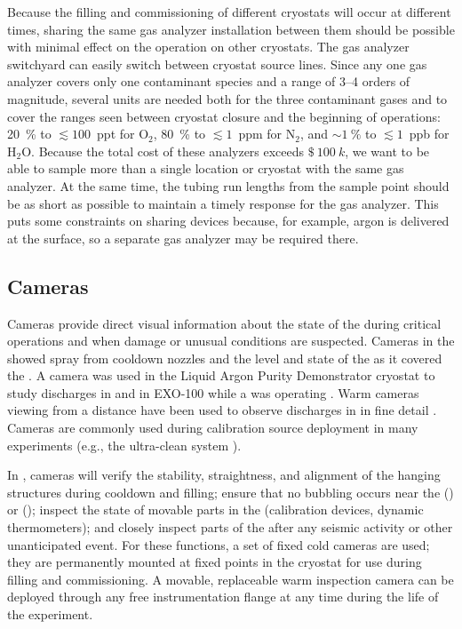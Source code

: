 Because the filling and commissioning of different cryostats will occur at different times, sharing the same gas analyzer installation between them should be possible with minimal effect on the operation on other cryostats. The gas analyzer switchyard can easily switch between cryostat source lines.
Since any one gas analyzer covers only one contaminant species and a range of \numrange{3}{4} orders of magnitude, several units are needed both for the three contaminant gases and to cover the ranges seen between cryostat closure and the beginning of  operations:
\SI{20}{\percent} to $\lesssim 100$~ppt for $\text{O}_2$,
\SI{80}{\percent} to $\lesssim 1$~ppm for $\text{N}_2$, and
$\sim \SI{1}{\percent}$ to $\lesssim 1$~ppb for $\text{H}_2\text{O}$.
Because the total cost of these analyzers exceeds $\SI{100}[\mathdollar]{k}$, we want to be able to  sample more than a single location or cryostat with the same gas analyzer. At the same time, the tubing run lengths from the sample point should be as short as possible to maintain a timely response for the gas analyzer. This puts some constraints on sharing devices because, for example, argon is delivered at the surface, so a separate gas analyzer may be required there. %


\subsection{Cameras}

Cameras provide direct visual information about the state of the
 during critical operations and when damage or unusual
conditions are suspected.  Cameras in the  showed spray from cooldown
nozzles and the level and state of the \lar as it covered the  \cite{Murphy:20170516}.  A camera was
used in the Liquid Argon Purity Demonstrator
cryostat\cite{Adamowski:2014daa} to study  discharges in
\lar and in EXO-100 while a  was operating
\cite{Delaquis:2013hva}.  Warm cameras viewing \lar from a distance
have been used to observe  discharges in \lar in
fine detail \cite{Auger:2015xlo}.  Cameras are commonly used during
calibration source deployment in many experiments (e.g., the
\kamland ultra-clean system \cite{Banks:2014hra}).

In , cameras will verify the stability, straightness,
and alignment of the hanging  structures during cooldown and
filling; ensure that no bubbling occurs near the 
(\single) or  (\dual); inspect the
state of movable parts in the  (calibration devices, dynamic
thermometers); and closely inspect parts of the  after any seismic activity or other unanticipated
event.  For these functions, a set of fixed
cold cameras are used; they are permanently mounted at fixed points in the cryostat
for use during filling and commissioning. A movable, replaceable
warm inspection camera can be deployed through any free
instrumentation flange at any time during the life of the
experiment. 
 
